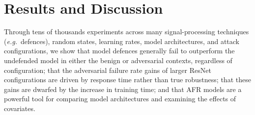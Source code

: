 \section{Results and Discussion}
\label{results}

Through tens of thousands experiments across many signal-processing techniques (\textit{e.g.}~defences), random states, learning rates, model architectures, and attack configurations, we show that model defences generally fail to outperform the undefended model in either the benign or adversarial contexts, regardless of configuration; that the adversarial failure rate gains of larger ResNet configurations are driven by response time rather than true robustness; that these gains are dwarfed by the increase in training time; and that AFR models are a powerful tool for comparing model architectures and examining the effects of covariates.

